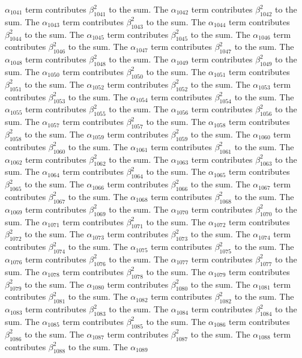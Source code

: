 \begin{lemma}
$\alpha_{1041}$ term contributes $\beta_{1041}^{2}$ to the sum. The $\alpha_{1042}$ term contributes $\beta_{1042}^{2}$ to the sum. The $\alpha_{1043}$ term contributes $\beta_{1043}^{2}$ to the sum. The $\alpha_{1044}$ term contributes $\beta_{1044}^{2}$ to the sum. The $\alpha_{1045}$ term contributes $\beta_{1045}^{2}$ to the sum. The $\alpha_{1046}$ term contributes $\beta_{1046}^{2}$ to the sum. The $\alpha_{1047}$ term contributes $\beta_{1047}^{2}$ to the sum. The $\alpha_{1048}$ term contributes $\beta_{1048}^{2}$ to the sum. The $\alpha_{1049}$ term contributes $\beta_{1049}^{2}$ to the sum. The $\alpha_{1050}$ term contributes $\beta_{1050}^{2}$ to the sum. The $\alpha_{1051}$ term contributes $\beta_{1051}^{2}$ to the sum. The $\alpha_{1052}$ term contributes $\beta_{1052}^{2}$ to the sum. The $\alpha_{1053}$ term contributes $\beta_{1053}^{2}$ to the sum. The $\alpha_{1054}$ term contributes $\beta_{1054}^{2}$ to the sum. The $\alpha_{1055}$ term contributes $\beta_{1055}^{2}$ to the sum. The $\alpha_{1056}$ term contributes $\beta_{1056}^{2}$ to the sum. The $\alpha_{1057}$ term contributes $\beta_{1057}^{2}$ to the sum. The $\alpha_{1058}$ term contributes $\beta_{1058}^{2}$ to the sum. The $\alpha_{1059}$ term contributes $\beta_{1059}^{2}$ to the sum. The $\alpha_{1060}$ term contributes $\beta_{1060}^{2}$ to the sum. The $\alpha_{1061}$ term contributes $\beta_{1061}^{2}$ to the sum. The $\alpha_{1062}$ term contributes $\beta_{1062}^{2}$ to the sum. The $\alpha_{1063}$ term contributes $\beta_{1063}^{2}$ to the sum. The $\alpha_{1064}$ term contributes $\beta_{1064}^{2}$ to the sum. The $\alpha_{1065}$ term contributes $\beta_{1065}^{2}$ to the sum. The $\alpha_{1066}$ term contributes $\beta_{1066}^{2}$ to the sum. The $\alpha_{1067}$ term contributes $\beta_{1067}^{2}$ to the sum. The $\alpha_{1068}$ term contributes $\beta_{1068}^{2}$ to the sum. The $\alpha_{1069}$ term contributes $\beta_{1069}^{2}$ to the sum. The $\alpha_{1070}$ term contributes $\beta_{1070}^{2}$ to the sum. The $\alpha_{1071}$ term contributes $\beta_{1071}^{2}$ to the sum. The $\alpha_{1072}$ term contributes $\beta_{1072}^{2}$ to the sum. The $\alpha_{1073}$ term contributes $\beta_{1073}^{2}$ to the sum. The $\alpha_{1074}$ term contributes $\beta_{1074}^{2}$ to the sum. The $\alpha_{1075}$ term contributes $\beta_{1075}^{2}$ to the sum. The $\alpha_{1076}$ term contributes $\beta_{1076}^{2}$ to the sum. The $\alpha_{1077}$ term contributes $\beta_{1077}^{2}$ to the sum. The $\alpha_{1078}$ term contributes $\beta_{1078}^{2}$ to the sum. The $\alpha_{1079}$ term contributes $\beta_{1079}^{2}$ to the sum. The $\alpha_{1080}$ term contributes $\beta_{1080}^{2}$ to the sum. The $\alpha_{1081}$ term contributes $\beta_{1081}^{2}$ to the sum. The $\alpha_{1082}$ term contributes $\beta_{1082}^{2}$ to the sum. The $\alpha_{1083}$ term contributes $\beta_{1083}^{2}$ to the sum. The $\alpha_{1084}$ term contributes $\beta_{1084}^{2}$ to the sum. The $\alpha_{1085}$ term contributes $\beta_{1085}^{2}$ to the sum. The $\alpha_{1086}$ term contributes $\beta_{1086}^{2}$ to the sum. The $\alpha_{1087}$ term contributes $\beta_{1087}^{2}$ to the sum. The $\alpha_{1088}$ term contributes $\beta_{1088}^{2}$ to the sum. The $\alpha_{1089}$ 
\end{lemma}
